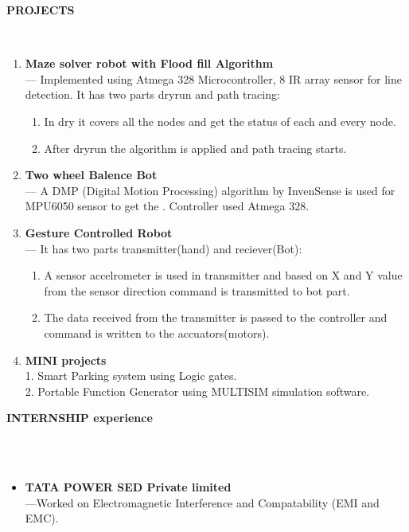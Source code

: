 \documentclass[a4paper,10pt]{article}
\newcommand{\lsep}{-0.5cm}
\newcommand{\resheading}[1]{{\small \colorbox{mygrey}{\begin{minipage}{0.975\textwidth}{\textbf{#1 \vphantom{p\^{E}}}}\end{minipage}}}}
\begin{document}
\resheading{\textbf{PROJECTS} }\\[\lsep]
\begin{enumerate}
\item \noindent \textbf{Maze solver robot with Flood fill Algorithm}\\
\indent --- Implemented using Atmega 328 Microcontroller, 8 IR array sensor for line detection. It has two parts dryrun and path tracing:
\begin{enumerate}
\item In dry it covers all the nodes and get the status of each and every node.
\item  After dryrun the algorithm is applied and path tracing starts.
\end{enumerate} 

\item\noindent\textbf{Two wheel Balence Bot}\\
\indent --- A DMP (Digital Motion Processing) algorithm by InvenSense is used for MPU6050 sensor to get the . Controller used Atmega 328.

\item\noindent\textbf{Gesture Controlled Robot}\\
\indent --- It has two parts transmitter(hand) and reciever(Bot):
\begin{enumerate}
\item  A sensor accelrometer is used in transmitter and based on X and Y value from the sensor direction command is transmitted to bot part.
\item The data received from the transmitter is passed to the controller and command is written to the accuators(motors).
\end{enumerate}
\item\noindent\textbf{MINI projects}\\
1. Smart Parking system using Logic gates.\\
2. Portable Function Generator using MULTISIM simulation software.
\end{enumerate}

\resheading{\textbf{INTERNSHIP experience} }\\\\[\lsep]
\begin{itemize}
\item\noindent\textbf{TATA POWER SED Private limited}\\
\indent ---Worked on Electromagnetic Interference and Compatability (EMI and EMC).
\end{itemize}
\end{document}
